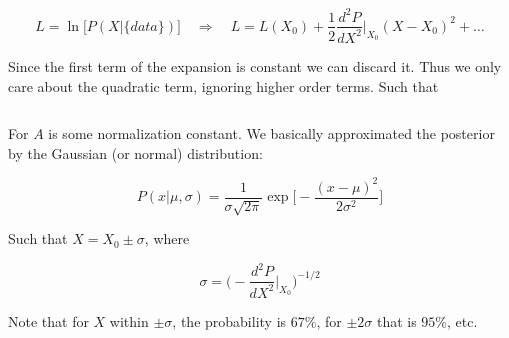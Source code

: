 \documentclass[a4paper]{article}
\begin{document}
\begin{equation}
	L=\ln\big[P(X|\{data\})\big]\quad\Rightarrow\quad L=L(X_0)+\frac{1}{2}\frac{d^2P}{dX^2}\bigg|_{X_0}(X-X_0)^2+\dots
\end{equation}

Since the first term of the expansion is constant we can discard it. Thus we only care about the quadratic term, ignoring higher order terms. Such that

\begin{equation}
	[P(X|\{data\})\approx A\exp\bigg[\frac{1}{2}\frac{d^2P}{dX^2}\bigg|_{X_0}(X-X_0)^2\bigg]
\end{equation}

For $A$ is some normalization constant. We basically approximated the posterior by the Gaussian (or normal) distribution:

\begin{equation}
	P(x|\mu, \sigma)=\frac{1}{\sigma\sqrt{2\pi}}\exp\bigg[-\frac{(x-\mu)^2}{2\sigma^2}\bigg]
\end{equation}

Such that $X=X_0\pm\sigma$, where

\begin{equation}
	\sigma = \bigg(-\frac{d^2P}{dX^2}\bigg|_{X_0}\bigg)^{-1/2}
\end{equation}

Note that for $X$ within $\pm\sigma$, the probability is $67\%$, for $\pm 2\sigma$ that is $95\%$, etc.
\end{document}
